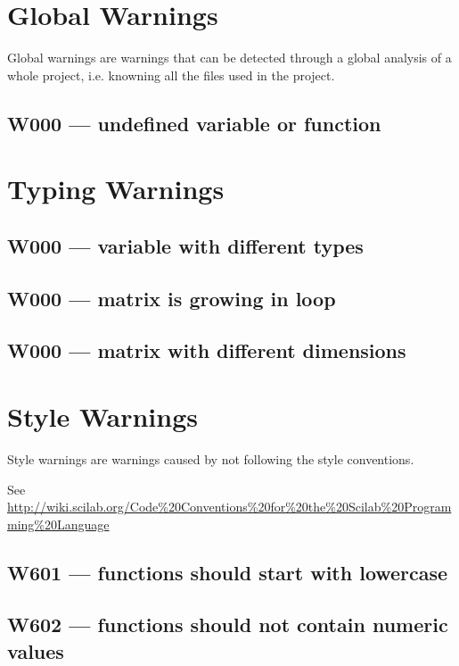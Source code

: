 \section{Global Warnings}

Global warnings are warnings that can be detected through a global
analysis of a whole project, i.e. knowning all the files used in the
project.

\subsection{W000 --- undefined variable or function}




\section{Typing Warnings}



\subsection{W000 --- variable with different types}




\subsection{W000 --- matrix is growing in loop}




\subsection{W000 --- matrix with different dimensions}




\section{Style Warnings}



Style warnings are warnings caused by not following the style conventions.



See \url{http://wiki.scilab.org/Code%20Conventions%20for%20the%20Scilab%20Programming%20Language}



\subsection{W601 --- functions should start with lowercase}




\subsection{W602 --- functions should not contain numeric values}




